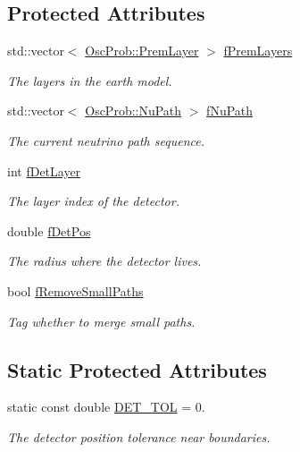 \subsection*{Protected Attributes}
\begin{DoxyCompactItemize}
\item 
std\+::vector$<$ \hyperlink{structOscProb_1_1PremLayer}{Osc\+Prob\+::\+Prem\+Layer} $>$ \hyperlink{classOscProb_1_1PremModel_a19a9a3b23ec154ad7a29f92b74aa5bc6}{f\+Prem\+Layers}
\begin{DoxyCompactList}\small\item\em The layers in the earth model. \end{DoxyCompactList}\item 
std\+::vector$<$ \hyperlink{structOscProb_1_1NuPath}{Osc\+Prob\+::\+Nu\+Path} $>$ \hyperlink{classOscProb_1_1PremModel_aaf3c77e35798d664853157013c90ad2b}{f\+Nu\+Path}
\begin{DoxyCompactList}\small\item\em The current neutrino path sequence. \end{DoxyCompactList}\item 
int \hyperlink{classOscProb_1_1PremModel_a4fb68506493666349f418b893a996185}{f\+Det\+Layer}
\begin{DoxyCompactList}\small\item\em The layer index of the detector. \end{DoxyCompactList}\item 
double \hyperlink{classOscProb_1_1PremModel_ab12ea0343cd11b9233ffd20ab5e620c7}{f\+Det\+Pos}
\begin{DoxyCompactList}\small\item\em The radius where the detector lives. \end{DoxyCompactList}\item 
bool \hyperlink{classOscProb_1_1PremModel_a3973df6f5f2ff219cd2f865b31aacfd2}{f\+Remove\+Small\+Paths}
\begin{DoxyCompactList}\small\item\em Tag whether to merge small paths. \end{DoxyCompactList}\end{DoxyCompactItemize}
\subsection*{Static Protected Attributes}
\begin{DoxyCompactItemize}
\item 
static const double \hyperlink{classOscProb_1_1PremModel_a8ad1335ebe80ee1cd1cdf59d774ab34b}{D\+E\+T\+\_\+\+T\+OL} = 0.
\begin{DoxyCompactList}\small\item\em The detector position tolerance near boundaries. \end{DoxyCompactList}\end{DoxyCompactItemize}



